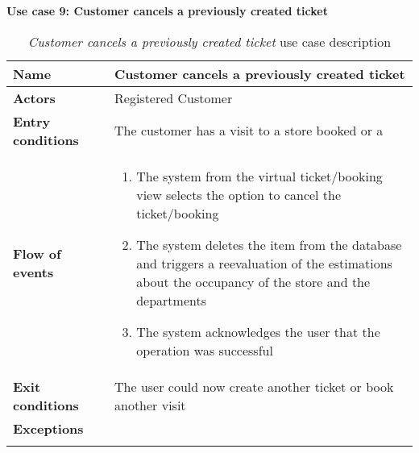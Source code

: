     \clearpage
    \textbf{Use case 9: Customer cancels a previously created ticket}
    \smallskip
    \begin{longtable}{p{0.25\linewidth}p{0.75\linewidth}}
    \toprule
    \textbf{Name} & \textbf{Customer cancels a previously created ticket} \\
    \midrule
    \textbf{Actors} & Registered Customer\\
    \midrule
    \textbf{Entry conditions} & The customer has a visit to a store booked or a \\
    \midrule
    \textbf{Flow of events} & 
    \begin{enumerate}
        \item The system from the virtual ticket/booking view selects the option to cancel the ticket/booking
        \item The system deletes the item from the database and triggers a reevaluation of the estimations about the occupancy of the store and the departments
        \item The system acknowledges the user that the operation was successful 
    \end{enumerate} \\
    \midrule
    \textbf{Exit conditions} & The user could now create another ticket or book another visit\\
    \midrule
    \textbf{Exceptions} & \\
    \bottomrule
    \caption{\emph{Customer cancels a previously created ticket} use case description}
    \end{longtable}

